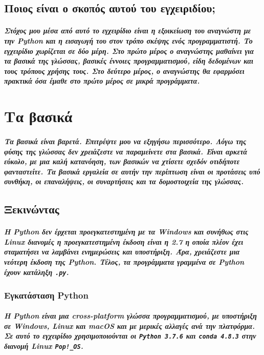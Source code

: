 \documentclass[a4paper,10pt]{report}
\begin{document}
\section{Ποιος είναι ο σκοπός αυτού του εγχειριδίου;}
\paragraph{
    Στόχος μου μέσα από αυτό το εγχειρίδιο είναι η εξοικείωση του αναγνώστη
    με την Python και η εισαγωγή του στον τρόπο σκέψης ενός προγραμματιστή.
    Το εγχειρίδιο χωρίζεται σε δύο μέρη. Στο πρώτο μέρος ο αναγνώστης μαθαίνει
    για τα βασικά της γλώσσας, βασικές έννοιες προγραμματισμού, είδη δεδομένων
    και τους τρόπους χρήσης τους. Στο δεύτερο μέρος, ο αναγνώστης θα εφαρμόσει
    πρακτικά όσα έμαθε στο πρώτο μέρος σε μικρά προγράμματα.
}

\chapter{Τα βασικά}
\paragraph{
    Τα βασικά είναι βαρετά. Επιτρέψτε μου να εξηγήσω περισσότερο. Λόγω της
    φύσης της γλώσσας δεν χρειάζεστε να παραμείνετε στα βασικά. Είναι αρκετά
    εύκολο, με μια καλή κατανόηση, των βασικών να χτίσετε σχεδόν οτιδήποτε
    φανταστείτε. Τα βασικά εργαλεία σε αυτήν την περίπτωση είναι οι προτάσεις
    υπό συνθήκη, οι επαναλήψεις, οι συναρτήσεις και τα δομοστοιχεία της γλώσσας.
}
\section{Ξεκινώντας}
\paragraph{
    Η Python δεν έρχεται προεγκατεστημένη με τα Windows και συνήθως στις
    Linux διανομές η προεγκατεστημένη έκδοση είναι η 2.7 η οποία πλέον έχει
    σταματήσει να λαμβάνει ενημερώσεις και υποστήριξη. Άρα, χρειάζεστε μια
    νεότερη έκδοση της Python. Τέλος, τα προγράμματα γραμμένα σε Python
    έχουν κατάληξη \lstinline{.py}.
}
\subsection{Εγκατάσταση Python}
\paragraph{
    Η Python είναι μια cross-platform γλώσσα προγραμματισμού, με υποστήριξη
    σε Windows, Linux και macOS και με μερικές αλλαγές ανά την πλατφόρμα.
    Σε αυτό το εγχειρίδιο χρησιμοποιούνται οι
    \lstinline{Python 3.7.6} και
    \lstinline{conda 4.8.3}
    στην διανομή Linux \lstinline{Pop!_OS}.
}
\end{document}
